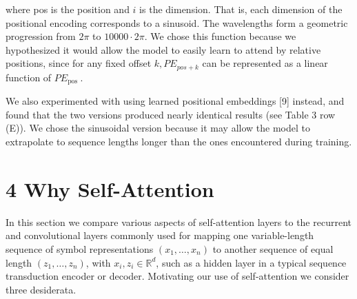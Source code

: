 \documentclass[10pt]{article}
\begin{document}
where pos is the position and $i$ is the dimension. That is, each dimension of the positional encoding corresponds to a sinusoid. The wavelengths form a geometric progression from $2 \pi$ to $10000 \cdot 2 \pi$. We chose this function because we hypothesized it would allow the model to easily learn to attend by relative positions, since for any fixed offset $k, P E_{p o s+k}$ can be represented as a linear function of $P E_{\text {pos }}$.

We also experimented with using learned positional embeddings [9] instead, and found that the two versions produced nearly identical results (see Table 3 row (E)). We chose the sinusoidal version because it may allow the model to extrapolate to sequence lengths longer than the ones encountered during training.

\section*{4 Why Self-Attention}
In this section we compare various aspects of self-attention layers to the recurrent and convolutional layers commonly used for mapping one variable-length sequence of symbol representations $\left(x_{1}, \ldots, x_{n}\right)$ to another sequence of equal length $\left(z_{1}, \ldots, z_{n}\right)$, with $x_{i}, z_{i} \in \mathbb{R}^{d}$, such as a hidden layer in a typical sequence transduction encoder or decoder. Motivating our use of self-attention we consider three desiderata.
\end{document}
